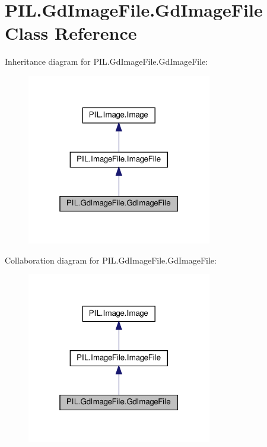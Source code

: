 \hypertarget{classPIL_1_1GdImageFile_1_1GdImageFile}{}\section{P\+I\+L.\+Gd\+Image\+File.\+Gd\+Image\+File Class Reference}
\label{classPIL_1_1GdImageFile_1_1GdImageFile}


Inheritance diagram for P\+I\+L.\+Gd\+Image\+File.\+Gd\+Image\+File\+:
\nopagebreak
\begin{figure}[H]
\begin{center}
\leavevmode
\includegraphics[width=229pt]{classPIL_1_1GdImageFile_1_1GdImageFile__inherit__graph}
\end{center}
\end{figure}


Collaboration diagram for P\+I\+L.\+Gd\+Image\+File.\+Gd\+Image\+File\+:
\nopagebreak
\begin{figure}[H]
\begin{center}
\leavevmode
\includegraphics[width=229pt]{classPIL_1_1GdImageFile_1_1GdImageFile__coll__graph}
\end{center}
\end{figure}
